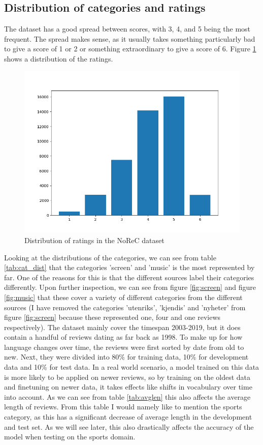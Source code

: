 \subsection{Distribution of categories and ratings} 
The dataset has a good spread between scores, with 3, 4, and 5 being the most frequent. The spread makes sense, as it usually takes something particularly bad to give a score of 1 or 2 or something extraordinary to give a score of 6. Figure \ref{fig:ratings} shows a distribution of the ratings.
\begin{figure}[h!]
	\centering
	\includegraphics[scale=0.5]{img/ratings_new}
	\caption{Distribution of ratings in the NoReC dataset}
	\label{fig:ratings}
\end{figure}%
Looking at the distributions of the categories, we can see from table \ref{tab:cat_dist} that the categories 'screen' and 'music' is the most represented by far. One of the reasons for this is that the different sources label their categories differently. Upon further inspection, we can see from figure \ref{fig:screen} and figure \ref{fig:music} that these cover a variety of different categories from the different sources (I have removed the categories 'utenriks', 'kjendis' and 'nyheter' from figure \ref{fig:screen} because these represented one, four and one reviews respectively). The dataset mainly cover the timespan 2003-2019, but it does contain a handful of reviews dating as far back as 1998. To make up for how language changes over time, the reviews were first sorted by date from old to new. Next, they were divided into 80\% for training data, 10\% for development data and 10\% for test data. In a real world scenario, a model trained on this data is more likely to be applied on newer reviews, so by training on the oldest data and finetuning on newer data, it takes effects like shifts in vocabulary over time into account. As we can see from table \ref{tab:avglen} this also affects the average length of reviews. From this table I would namely like to mention the sports category, as this has a significant decrease of average length in the development and test set. As we will see later, this also drastically affects the accuracy of the model when testing on the sports domain.\\
